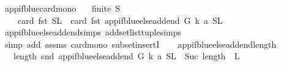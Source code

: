\begin{isabellebody}
\isamarkupfalse%
\ app{\isacharunderscore}{\kern0pt}if{\isacharunderscore}{\kern0pt}blue{\isacharunderscore}{\kern0pt}card{\isacharunderscore}{\kern0pt}mono{\isacharcolon}{\kern0pt}\isanewline
\ \ \ {\isachardoublequoteopen}finite\ S{\isachardoublequoteclose}\isanewline
\ \ \ \ {\isachardoublequoteopen}card\ {\isacharparenleft}{\kern0pt}fst\ {\isacharparenleft}{\kern0pt}S{\isacharcomma}{\kern0pt}L{\isacharparenright}{\kern0pt}{\isacharparenright}{\kern0pt}\ {\isasymle}\ card\ {\isacharparenleft}{\kern0pt}fst\ {\isacharparenleft}{\kern0pt}app{\isacharunderscore}{\kern0pt}if{\isacharunderscore}{\kern0pt}blue{\isacharunderscore}{\kern0pt}else{\isacharunderscore}{\kern0pt}add{\isacharunderscore}{\kern0pt}end\ G\ k\ a\ {\isacharparenleft}{\kern0pt}S{\isacharcomma}{\kern0pt}L{\isacharparenright}{\kern0pt}{\isacharparenright}{\kern0pt}{\isacharparenright}{\kern0pt}{\isachardoublequoteclose}\isanewline
%
\isadelimproof
\ \ %
\endisadelimproof
%
\isatagproof
{}\isamarkupfalse%
\ app{\isacharunderscore}{\kern0pt}if{\isacharunderscore}{\kern0pt}blue{\isacharunderscore}{\kern0pt}else{\isacharunderscore}{\kern0pt}add{\isacharunderscore}{\kern0pt}end{\isachardot}{\kern0pt}simps\ add{\isacharunderscore}{\kern0pt}set{\isacharunderscore}{\kern0pt}list{\isacharunderscore}{\kern0pt}tuple{\isachardot}{\kern0pt}simps\isanewline
\ \ \isamarkupfalse%
\ {\isacharparenleft}{\kern0pt}simp\ add{\isacharcolon}{\kern0pt}\ assms\ card{\isacharunderscore}{\kern0pt}mono\ subset{\isacharunderscore}{\kern0pt}insertI{\isacharparenright}{\kern0pt}%
\endisatagproof
{\isafoldproof}%
%
\isadelimproof
\ \ \isanewline
%
\endisadelimproof
\isanewline
\isanewline
\isanewline
{}\isamarkupfalse%
\ app{\isacharunderscore}{\kern0pt}if{\isacharunderscore}{\kern0pt}blue{\isacharunderscore}{\kern0pt}else{\isacharunderscore}{\kern0pt}add{\isacharunderscore}{\kern0pt}end{\isacharunderscore}{\kern0pt}length{\isacharcolon}{\kern0pt}\isanewline
\ \ \ {\isachardoublequoteopen}length\ {\isacharparenleft}{\kern0pt}snd\ {\isacharparenleft}{\kern0pt}app{\isacharunderscore}{\kern0pt}if{\isacharunderscore}{\kern0pt}blue{\isacharunderscore}{\kern0pt}else{\isacharunderscore}{\kern0pt}add{\isacharunderscore}{\kern0pt}end\ G\ k\ a\ {\isacharparenleft}{\kern0pt}S{\isacharcomma}{\kern0pt}L{\isacharparenright}{\kern0pt}{\isacharparenright}{\kern0pt}{\isacharparenright}{\kern0pt}\ {\isacharequal}{\kern0pt}\ Suc\ {\isacharparenleft}{\kern0pt}length\ \ L{\isacharparenright}{\kern0pt}{\isachardoublequoteclose}\isanewline

\end{isabellebody}

